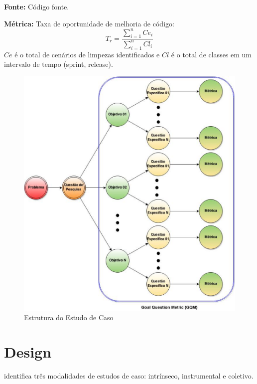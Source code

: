 \textbf{Fonte:} Código fonte.

\textbf{Métrica:} Taxa de oportunidade de melhoria de código: $$ T_r =   \frac{{\sum_{i=1}^{n}{Ce_i}}}{\sum_{i=1}^{n}{Cl_i}} $$ $ Ce $ é o total de cenários de limpezas identificados e $ Cl $  é o total de classes em um intervalo de tempo (sprint, release).
	
\begin{figure}[h!]
\centering
\includegraphics[keepaspectratio=false,scale=0.5]{figuras/figuras_nilton/EstruturaEstudoCaso.eps}
\caption{Estrutura do Estudo de Caso}
\label{EstruturaEstudoCaso}
\end{figure}


\section{Design}
\label{sec:design} 

 identifica três modalidades de estudos de caso: intrínseco, instrumental e coletivo. 

